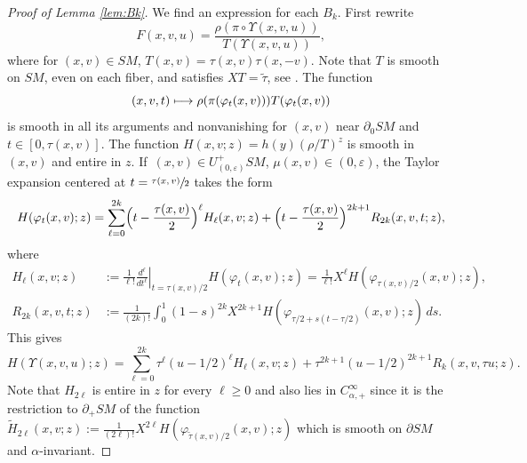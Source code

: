 \documentclass[JEP,XML,SOM,Unicode,NoFloatCountersInSection, NoEqCountersInSection,published]{cedram}
\def\mto{\mathchoice{\longmapsto}{\mapsto}{\mapsto}{\mapsto}}
\theoremstyle{plain}
\theoremstyle{definition}
\theoremstyle{remark}
\def\t{\tilde{\tau}}
\begin{document}
\begin{proof}[Proof of Lemma \ref{lem:Bk}]
We find an expression for each $B_k$. First rewrite
\[
F(x,v,u) = \frac{\rho(\pi\circ\Upsilon(x,v,u))}{T(\Upsilon(x,v,u))},
\]
where for $(x,v)\in SM$, $T(x,v) = \tau(x,v) \tau(x,-v)$. Note that $T$ is smooth on $SM$, even on each fiber, and satisfies
$XT = \t$, see \cite[Lem.\,3.2.11]{Paternain2021}. The function
\begin{equation*}
(x,v,t)\mto \rho(\pi (\varphi_t(x,v)))T(\varphi_t(x,v))
\end{equation*}
is smooth in all its arguments and nonvanishing for $(x,v)$ near $\partial_0 SM$ and $t\in [0,\tau(x,v)]$.
The function $H(x,v; z) = h(y) \left(\rho/T \right)^z$ is smooth in $(x,v)$ and entire in $z$.
If~$(x,v)\in U^+_{(0,\varepsilon)} SM$, \ie $\mu(x,v) \in (0,\varepsilon)$, the Taylor expansion centered at $t = \sfrac{\tau(x,v)}{2}$
takes the form
\begin{equation*}
H(\varphi_t(x,v); z) = \sum_{\ell=0}^{2k} \Bigl(t-\frac{\tau(x,v)}{2} \Bigr)^\ell H_\ell (x,v; z) + \Bigl(t-\frac{\tau(x,v)}{2} \Bigr)^{2k+1}
R_{2k}(x,v,t; z),
\end{equation*}
where
\begin{align*}
H_\ell(x,v; z) &:= \frac{1}{\ell !} \left. \frac{d^\ell}{dt^\ell}\right|_{t=\tau(x,v)/2} H(\varphi_{t}(x,v); z) = \frac{1}{\ell!} X^\ell H (\varphi_{\tau(x,v)/2}(x,v); z), \\
R_{2k} (x,v,t; z) &:= \frac{1}{(2k)!} \int_0^1 (1-s)^{2k} X^{2k+1} H (\varphi_{\tau/2+s(t-\tau/2)}(x,v); z)\,ds.
\end{align*}
This gives
\begin{equation*}
H(\Upsilon(x,v,u); z) = \sum_{\ell=0}^{2k} \tau^\ell (u-1/2)^\ell H_\ell(x,v; z) + \tau^{2k+1} (u-1/2)^{2k+1} R_{k} (x,v,\tau u; z).
\end{equation*}
Note that $H_{2\ell}$ is entire in $z$ for every $\ell \geq 0$ and also lies in $C_{\alpha,+}^\infty$ since it is the restriction to $\partial_+ SM$ of the function $\widetilde{H}_{2\ell} (x,v; z) :=
\frac{1}{(2\ell)!}X^{2\ell}H (\varphi_{\t(x,v)/2}(x,v); z)$ which is smooth on $\partial SM$ and $\alpha$-invariant.


\end{proof}
\end{document}
